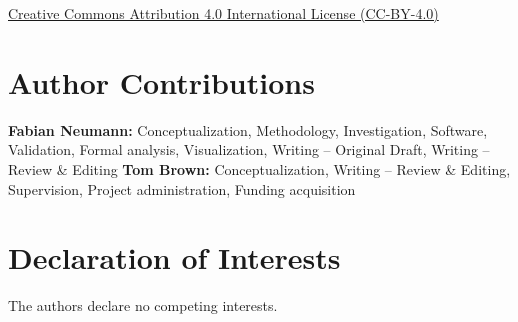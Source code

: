 \documentclass[1p,11pt]{elsarticle}
\begin{document}
\href{http://creativecommons.org/licenses/by/4.0/}{Creative Commons Attribution
4.0 International License (CC-BY-4.0)}

\section*{Author Contributions}

\textbf{Fabian Neumann:} Conceptualization, Methodology, Investigation,
Software, Validation, Formal analysis, Visualization, Writing -- Original Draft,
Writing -- Review \& Editing \textbf{Tom Brown:} Conceptualization, Writing --
Review \& Editing, Supervision, Project administration, Funding acquisition

\section*{Declaration of Interests}

The authors declare no competing interests.

\renewcommand{\ttdefault}{\sfdefault}


\newpage
\tableofcontents

\end{document}
